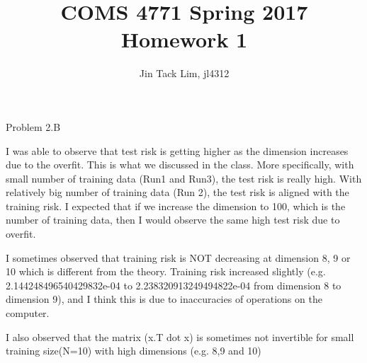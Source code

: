 \documentclass[11pt]{article}
\title{COMS 4771 Spring 2017 Homework 1}
\author{Jin Tack Lim, jl4312
  }
\date{%
  }
\theoremstyle{definition}
\begin{document}
\maketitle



Problem 2.B

I was able to observe that test risk is getting higher as the dimension
increases due to the overfit. This is what we discussed in the class. More
specifically, with small number of training data (Run1 and Run3), the test
risk is really high. With relatively big number of training data (Run 2), the
test risk is aligned with the training risk. I expected that if we increase the
dimension to 100, which is the number of training data, then I would observe
the same high test risk due to overfit.

I sometimes observed that training risk is NOT decreasing at dimension 8, 9 or 10 which is different from the theory. Training risk increased slightly (e.g. 2.144248496540429832e-04 to 2.238320913249494822e-04 from dimension 8 to dimension 9), and I think this is due to inaccuracies of operations on the computer.

I also observed that the matrix (x.T dot x) is sometimes not invertible for small training size(N=10) with high dimensions (e.g. 8,9 and 10)
\end{document}
